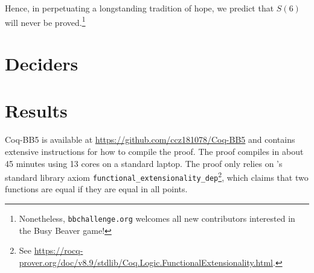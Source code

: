\documentclass[a4paper,british]{article}
\theoremstyle{definition} %
\numberwithin{equation}{section}
\theoremstyle{definition} %
\newcommand{\rado}{Rad\'o\xspace}
\newcommand{\CoqBB}{Coq-BB5\xspace}
\begin{document}

Hence, in perpetuating a longstanding tradition of hope, we predict that $S(6)$ will never be proved.\footnote{Nonetheless, \texttt{bbchallenge.org} welcomes all new contributors interested in the Busy Beaver game!}




\newpage



\section{Deciders}\label{sec:deciders}







% 

\newpage




\newpage


\newpage
\section{Results}\label{sec:results}

\CoqBB is available at \url{https://github.com/ccz181078/Coq-BB5} and contains extensive instructions for how to compile the proof. The proof compiles in about 45 minutes using 13 cores on a standard laptop. The proof only relies on \Coq's standard library axiom \texttt{functional\_extensionality\_dep}\footnote{See \url{https://rocq-prover.org/doc/v8.9/stdlib/Coq.Logic.FunctionalExtensionality.html}.}, which claims that two functions are equal if they are equal in all points.
\end{document}
